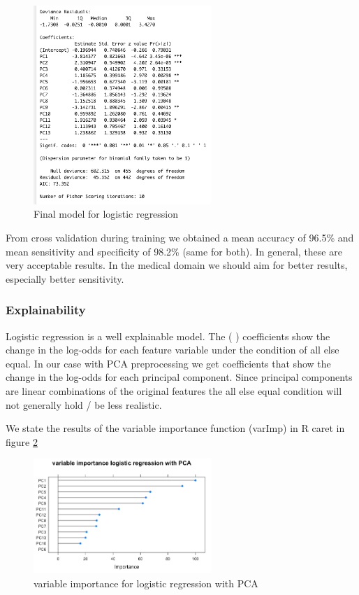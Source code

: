 \documentclass[]{article}
\begin{document}
\begin{figure}
    \centering
    \includegraphics[width=0.6\textwidth]{images/logR_final_model.png}
    \caption{Final model for logistic regression}
    \label{fig:logR-final-model}
\end{figure}

From cross validation during training we obtained a mean accuracy of
96.5\% and mean sensitivity and specificity of 98.2\% (same for both).
In general, these are very acceptable results. In the medical domain we
should aim for better results, especially better sensitivity.

\subsubsection{Explainability}\label{explainability}

Logistic regression is a well explainable model. The ( \beta )
coefficients show the change in the log-odds for each feature variable
under the condition of all else equal. In our case with PCA
preprocessing we get coefficients that show the change in the log-odds
for each principal component. Since principal components are linear
combinations of the original features the all else equal condition will
not generally hold / be less realistic.

We state the results of the variable importance function (varImp) in R
caret in figure \ref{fig:logR_var_imp}

\begin{figure}
    \centering
    \includegraphics[width=0.6\textwidth]{images/logR_varImportance.png}
    \caption{variable importance for logistic regression with PCA}
    \label{fig:logR_var_imp}
\end{figure}
\end{document}
